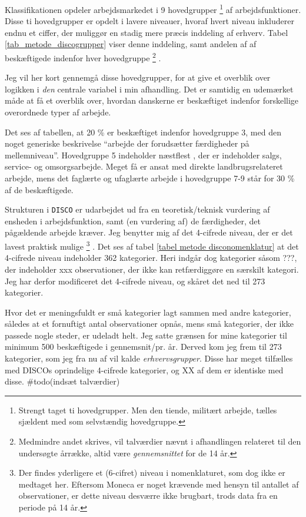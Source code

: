 Klassifikationen opdeler arbejdsmarkedet i 9 hovedgrupper%
%
		\footnote{ Strengt taget ti hovedgrupper. Men den tiende, militært arbejde, tælles sjældent med som selvstændig hovedgruppe.}%
%
 af arbejdsfunktioner. Disse ti hovedgrupper er opdelt i lavere niveauer, hvoraf hvert niveau inkluderer endnu et ciffer, der muliggør en stadig mere præcis inddeling af erhverv. Tabel \ref{tab_metode_discogrupper} viser denne inddeling, samt andelen af af beskæftigede indenfor hver hovedgruppe%
     \footnote{ Medmindre andet skrives, vil talværdier nævnt i afhandlingen relateret til den undersøgte årrække, altid være \emph{gennemsnittet} for de 14 år.}%
. 

Jeg vil her kort gennemgå disse hovedgrupper, for at give et overblik over logikken i \emph{den} centrale variabel i min afhandling. Det er samtidig en udemærket måde at få et overblik over, hvordan danskerne er beskæftiget indenfor forskellige overordnede typer af arbejde.

%


Det ses af tabellen, at 20 \% er beskæftiget indenfor hovedgruppe 3, med den noget generiske beskrivelse “arbejde der forudsætter færdigheder på mellemniveau”. Hovedgruppe 5 indeholder næstflest , der er indeholder salgs, service- og omsorgsarbejde. Meget få er ansat med direkte landbrugsrelateret arbejde, mens det faglærte og ufaglærte arbejde i hovedgruppe 7-9 står for 30 \% af de beskæftigede.


Strukturen i \texttt{DISCO} er udarbejdet ud fra en teoretisk/teknisk vurdering af ensheden i arbejdsfunktion, samt (en vurdering  af) de færdigheder, det pågældende arbejde kræver. Jeg benytter mig af det 4-cifrede niveau, der er det lavest praktisk mulige%
%
    \footnote{ Der findes yderligere et (6-cifret) niveau i nomenklaturet, som dog ikke er medtaget her. Eftersom Moneca er noget krævende med hensyn til antallet af observationer, er dette niveau desværre ikke brugbart, trods data fra en periode på 14 år.}%
%
 . Det ses af tabel \ref{tabel metode disconomenklatur} at det 4-cifrede niveau indeholder 362 kategorier. Heri indgår dog kategorier såsom ???, der indeholder xxx observationer, der ikke kan retfærdiggøre en særskilt kategori. Jeg har derfor modificeret det 4-cifrede niveau, og skåret det ned til 273 kategorier. 

 Hvor det er meningsfuldt er små kategorier  lagt sammen med andre kategorier, således at et fornuftigt antal observationer opnås, mens små kategorier, der ikke passede nogle steder, er udeladt helt. Jeg satte grænsen for mine kategorier til minimum 500 beskæftigede i gennemsnit/pr. år. Derved kom jeg frem til 273 kategorier, som jeg fra nu af vil kalde \emph{erhvervsgrupper}. Disse har meget tilfælles med DISCOs oprindelige 4-cifrede kategorier, og XX af dem er identiske med disse. \#todo(indsæt talværdier)

